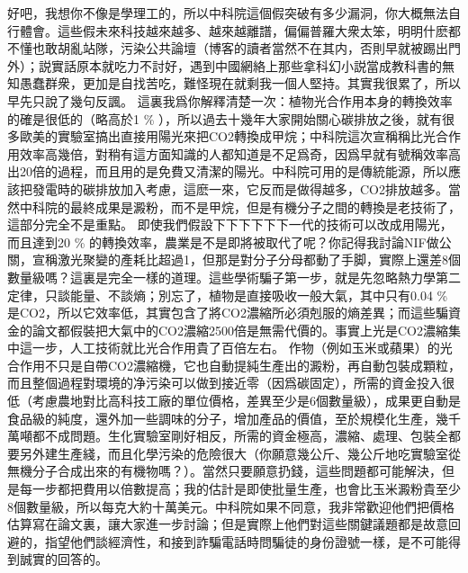 \documentclass[twocolumn]{ctexart}
\begin{document}
好吧，我想你不像是學理工的，所以中科院這個假突破有多少漏洞，你大概無法自行體會。這些假未來科技越來越多、越來越離譜，偏偏普羅大衆太笨，明明什麽都不懂也敢胡亂站隊，污染公共論壇（博客的讀者當然不在其内，否則早就被踢出門外）；説實話原本就吃力不討好，遇到中國網絡上那些拿科幻小説當成教科書的無知愚蠢群衆，更加是自找苦吃，難怪現在就剩我一個人堅持。其實我很累了，所以早先只說了幾句反諷。
這裏我爲你解釋清楚一次：植物光合作用本身的轉換效率的確是很低的（略高於1 \% ），所以過去十幾年大家開始關心碳排放之後，就有很多歐美的實驗室搞出直接用陽光來把CO2轉換成甲烷；中科院這次宣稱稱比光合作用效率高幾倍，對稍有這方面知識的人都知道是不足爲奇，因爲早就有號稱效率高出20倍的過程，而且用的是免費又清潔的陽光。中科院可用的是傳統能源，所以應該把發電時的碳排放加入考慮，這麽一來，它反而是做得越多，CO2排放越多。當然中科院的最終成果是澱粉，而不是甲烷，但是有機分子之間的轉換是老技術了，這部分完全不是重點。
即使我們假設下下下下下下一代的技術可以改成用陽光，而且達到20 \% 的轉換效率，農業是不是即將被取代了呢？你記得我討論NIF做公關，宣稱激光聚變的產耗比超過1，但那是對分子分母都動了手脚，實際上還差8個數量級嗎？這裏是完全一樣的道理。這些學術騙子第一步，就是先忽略熱力學第二定律，只談能量、不談熵；別忘了，植物是直接吸收一般大氣，其中只有0.04 \% 是CO2，所以它效率低，其實包含了將CO2濃縮所必須剋服的熵差異；而這些騙資金的論文都假裝把大氣中的CO2濃縮2500倍是無需代價的。事實上光是CO2濃縮集中這一步，人工技術就比光合作用貴了百倍左右。
作物（例如玉米或蘋果）的光合作用不只是自帶CO2濃縮機，它也自動提純生產出的澱粉，再自動包裝成顆粒，而且整個過程對環境的净污染可以做到接近零（因爲碳固定），所需的資金投入很低（考慮農地對比高科技工廠的單位價格，差異至少是6個數量級），成果更自動是食品級的純度，還外加一些調味的分子，增加產品的價值，至於規模化生產，幾千萬噸都不成問題。生化實驗室剛好相反，所需的資金極高，濃縮、處理、包裝全都要另外建生產綫，而且化學污染的危險很大（你願意幾公斤、幾公斤地吃實驗室從無機分子合成出來的有機物嗎？）。當然只要願意扔錢，這些問題都可能解決，但是每一步都把費用以倍數提高；我的估計是即使批量生產，也會比玉米澱粉貴至少8個數量級，所以每克大約十萬美元。中科院如果不同意，我非常歡迎他們把價格估算寫在論文裏，讓大家進一步討論；但是實際上他們對這些關鍵議題都是故意回避的，指望他們談經濟性，和接到詐騙電話時問騙徒的身份證號一樣，是不可能得到誠實的回答的。
\end{document}
